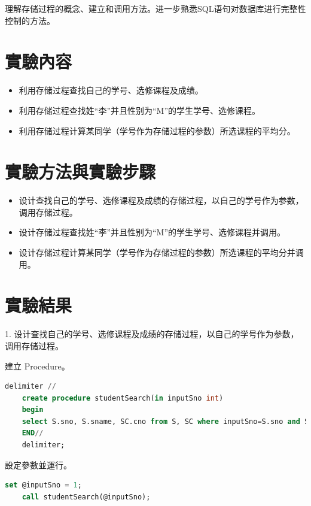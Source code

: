 \documentclass[12pt, a4paper]{report}
\begin{document}
理解存储过程的概念、建立和调用方法。进一步熟悉SQL语句对数据库进行完整性控制的方法。

\section{實驗內容}

\begin{itemize}
    \item 利用存储过程查找自己的学号、选修课程及成绩。
    \item 利用存储过程查找姓“李”并且性别为“M”的学生学号、选修课程。
    \item 利用存储过程计算某同学（学号作为存储过程的参数）所选课程的平均分。
\end{itemize}

\section{實驗方法與實驗步驟}

\begin{itemize}
    \item 设计查找自己的学号、选修课程及成绩的存储过程，以自己的学号作为参数，调用存储过程。
    \item 设计存储过程查找姓“李”并且性别为“M”的学生学号、选修课程并调用。
    \item 设计存储过程计算某同学（学号作为存储过程的参数）所选课程的平均分并调用。
\end{itemize}

\section{實驗結果}

1. 设计查找自己的学号、选修课程及成绩的存储过程，以自己的学号作为参数，调用存储过程。

建立 Procedure。\\

\begin{lstlisting}[language=SQL]
    delimiter //  
    create procedure studentSearch(in inputSno int)  
    begin
    select S.sno, S.sname, SC.cno from S, SC where inputSno=S.sno and SC.sno=inputSno; 
    END//  
    delimiter;
\end{lstlisting}

設定參數並運行。\\

\begin{lstlisting}[language=SQL]
    set @inputSno = 1;
    call studentSearch(@inputSno);
\end{lstlisting}
\end{document}

